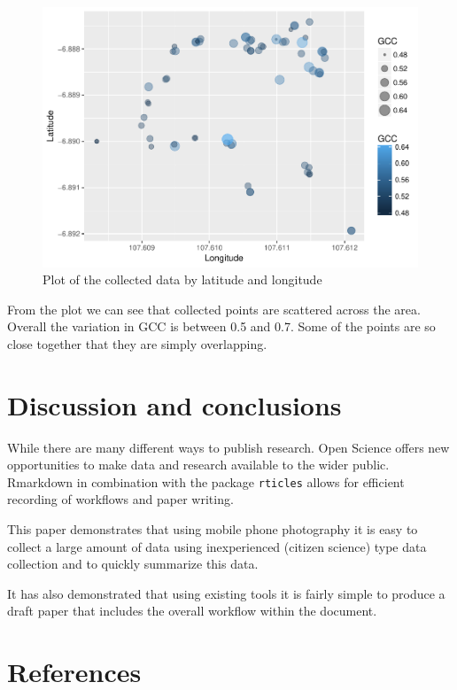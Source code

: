\documentclass[]{elsarticle} %
\makeatletter
\def\maxwidth{\ifdim\Gin@nat@width>\linewidth\linewidth
\else\Gin@nat@width\fi}
\let\Oldincludegraphics\includegraphics
\renewcommand{\includegraphics}[1]{\Oldincludegraphics[width=\maxwidth]{#1}}
\makeatother
\begin{document}
\begin{figure}
\centering
\includegraphics{DraftPaper_GCC_CitizenScience_files/figure-latex/plot_data-1.pdf}
\caption{Plot of the collected data by latitude and longitude}
\end{figure}

From the plot we can see that collected points are scattered across the
area. Overall the variation in GCC is between 0.5 and 0.7. Some of the
points are so close together that they are simply overlapping.

\section{Discussion and conclusions}\label{discussion-and-conclusions}

While there are many different ways to publish research. Open Science
offers new opportunities to make data and research available to the
wider public. Rmarkdown in combination with the package \texttt{rticles}
allows for efficient recording of workflows and paper writing.

This paper demonstrates that using mobile phone photography it is easy
to collect a large amount of data using inexperienced (citizen science)
type data collection and to quickly summarize this data.

It has also demonstrated that using existing tools it is fairly simple
to produce a draft paper that includes the overall workflow within the
document.

\section*{References}\label{references}
\end{document}

